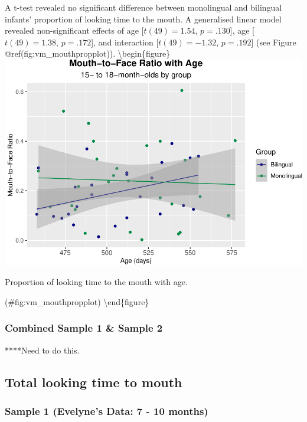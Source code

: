 \documentclass[english,man,floatsintext]{apa6}
\begin{document}
A t-test revealed no significant difference between monolingual and bilingual infants' proportion of looking time to the mouth. A generalised linear model revealed non-significant effects of age {[}\(t(49) = 1.54\), \(p = .130\){]}, age {[}\(t(49) = 1.38\), \(p = .172\){]}, and interaction {[}\(t(49) = -1.32\), \(p = .192\){]} (see Figure @ref(fig:vm\_mouthpropplot)).
\textbackslash{}begin\{figure\}
\includegraphics{Effects_of_early_language_experience_on_infants_files/figure-latex/vm_mouthpropplot-1}

\caption{Proportion of looking time to the mouth with age.}

(\#fig:vm\_mouthpropplot)
\textbackslash{}end\{figure\}

\hypertarget{combined-sample-1-sample-2}{%
\subsubsection{Combined Sample 1 \& Sample 2}\label{combined-sample-1-sample-2}}

****Need to do this.

\hypertarget{total-looking-time-to-mouth}{%
\subsection{Total looking time to mouth}\label{total-looking-time-to-mouth}}

\hypertarget{sample-1-evelynes-data-7---10-months-1}{%
\subsubsection{Sample 1 (Evelyne's Data: 7 - 10 months)}\label{sample-1-evelynes-data-7---10-months-1}}
\end{document}
